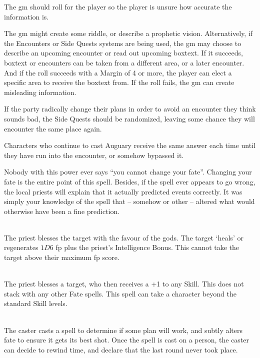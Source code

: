 \begin{multicols}{2}
The \gls{gm} should roll for the player so the player is unsure how accurate the information is.

The \gls{gm} might create some riddle, or describe a prophetic vision.
Alternatively, if the Encounters or Side Quests systems are being used, the \gls{gm} may choose to describe an upcoming encounter or read out upcoming boxtext.\iftoggle{verbose}{\footnote{See page \pageref{encounters}.}}{}
If it succeeds, boxtext or encounters can be taken from a different area, or a later encounter.
And if the roll succeeds with a Margin of 4 or more, the player can elect a specific area to receive the boxtext from.
If the roll fails, the \gls{gm} can create misleading information.

If the party radically change their plans in order to avoid an encounter they think sounds bad, the Side Quests should be randomized, leaving some chance they will encounter the same place again.

Characters who continue to cast Auguary receive the same answer each time until they have run into the encounter, or somehow bypassed it.

Nobody with this power ever says ``you cannot change your fate''.  Changing your fate is the entire point of this spell.  Besides, if the spell ever appears to go wrong, the local priests will explain that it actually predicted events correctly.  It was simply your knowledge of the spell that -- somehow or other -- altered what would otherwise have been a fine prediction.

\\
The priest blesses the target with the favour of the gods. The target `heals' or regenerates $1D6$ \gls{fp} plus the priest's Intelligence Bonus. This cannot take the target above their maximum \gls{fp} score.

\spelllevel

\\
The priest blesses a target, who then receives a +1 to any Skill.
This does not stack with any other Fate spells.
This spell can take a character beyond the standard Skill levels.

\\
The caster casts a spell to determine if some plan will work, and subtly alters fate to ensure it gets its best shot.
Once the spell is cast on a person, the caster can decide to rewind time, and declare that the last round never took place.


\end{multicols}
